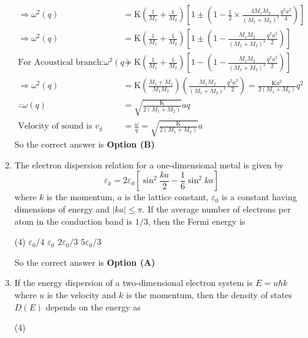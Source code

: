 \begin{enumerate}
\begin{answer}
\begin{align*}
\Rightarrow \omega^{2}(q)&=\mathrm{K}\left(\frac{1}{M_{1}}+\frac{1}{M_{2}}\right)\left[1 \pm\left(1-\frac{1}{2} \times \frac{4 M_{1} M_{2}}{\left(M_{1}+M_{2}\right)^{2}} \frac{q^{2} a^{2}}{4}\right)\right]\\
\Rightarrow \omega^{2}(q)&=\mathrm{K}\left(\frac{1}{M_{1}}+\frac{1}{M_{2}}\right)\left[1 \pm\left(1-\frac{M_{1} M_{2}}{\left(M_{1}+M_{2}\right)^{2}} \frac{q^{2} a^{2}}{2}\right)\right]\\
\text{For Acoustical branch:} \omega^{2}(q)&=\mathrm{K}\left(\frac{1}{M_{1}}+\frac{1}{M_{2}}\right)\left[1-\left(1-\frac{M_{1} M_{2}}{\left(M_{1}+M_{2}\right)^{2}} \frac{q^{2} a^{2}}{2}\right)\right]\\
\Rightarrow \omega^{2}(q)&=\mathrm{K}\left(\frac{M_{1}+M_{2}}{M_{1} M_{2}}\right)\left(\frac{M_{1} M_{2}}{\left(M_{1}+M_{2}\right)^{2}} \frac{q^{2} a^{2}}{2}\right)=\frac{\mathrm{K} a^{2}}{2\left(M_{1}+M_{2}\right)} q^{2}\\
\therefore \omega(q)&=\sqrt{\frac{\mathrm{K}}{2\left(M_{1}+M_{2}\right)}} a q\\
\text{Velocity of sound is } v_{g}&=\frac{\omega}{q}=\sqrt{\frac{\mathrm{K}}{2\left(M_{1}+M_{2}\right)}} a
\end{align*}
So the correct answer is \textbf{Option (B)}
\end{answer}
	\item The electron dispersion relation for a one-dimensional metal is given by
	$$
	\varepsilon_{k}=2 \varepsilon_{0}\left[\sin ^{2} \frac{k a}{2}-\frac{1}{6} \sin ^{2} k a\right]
	$$
	where $k$ is the momentum, $a$ is the lattice constant, $\varepsilon_{0}$ is a constant having dimensions of energy and $|k a| \leq \pi .$ If the average number of electrons per atom in the conduction band is $1 / 3$, then the Fermi energy is
	{}
\begin{tasks}(4)
\task[\textbf{A.}] $\varepsilon_{0} / 4$
\task[\textbf{B.}]  $\varepsilon_{0}$
\task[\textbf{C.}] $2 \varepsilon_{0} / 3$
\task[\textbf{D.}] $5 \varepsilon_{0} / 3$
\end{tasks}
\begin{answer}
So the correct answer is \textbf{Option (A)}
\end{answer}
	\item If the energy dispersion of a two-dimensional electron system is $E=u \hbar k$ where $u$ is the velocity and $k$ is the momentum, then the density of states $D(E)$ depends on the energy as
	{}
\begin{tasks}(4)

\end{tasks}
\end{enumerate}
